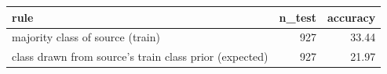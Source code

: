 \begin{tabular}{lrr}
\toprule
rule & n\_test & accuracy \\
\midrule
majority class of source (train) & 927 & 33.44 \\
class drawn from source's train class prior (expected) & 927 & 21.97 \\
\bottomrule
\end{tabular}

